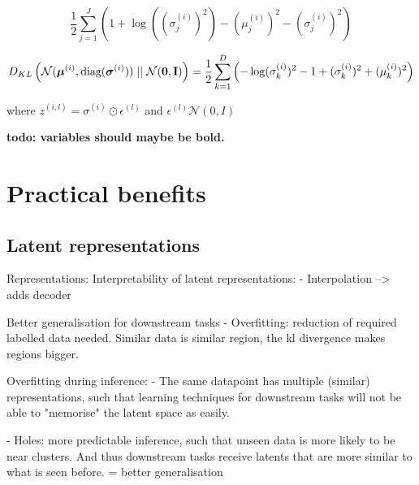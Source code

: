 	
		\begin{equation}
			\frac{1}{2}\sum_{j=1}^J \left( 1 + \log((\sigma_j^{(i)})^2) - (\mu_j^{(i)})^2 - (\sigma_j^{(i)})^2 \right) 
		\end{equation}
	
		\begin{equation} %
			\kl{\normal}{\standardnormal} = \latentspaceconstraintclosedform
		\end{equation}
	
		
		where $z^(i,l) = \sigma ^{(i)} \odot \epsilon^{(l)}$ and $\epsilon^(l) \mathcal{N}(0, I)$
	
		\textbf{todo: variables should maybe be bold.}
		
		
		
	
	
	
\section{Practical benefits}

\subsection{Latent representations}
	Representations:
		Interpretability of latent representations:
			- Interpolation --> adds decoder
	
	Better generalisation for downstream tasks
		- Overfitting: reduction of required labelled data needed. Similar data is similar region, the kl divergence makes regions bigger.

		Overfitting during inference:
		- The same datapoint has multiple (similar) representations, such that learning techniques for downstream tasks will not be able to "memorise" the latent space as easily.
		
		- Holes: more predictable inference, such that unseen data is more likely to be near clusters. And thus downstream tasks receive latents that are more similar to what is seen before.
		= better generalisation
		

